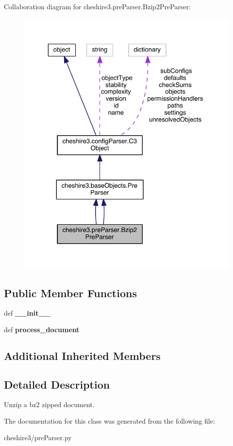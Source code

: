 Collaboration diagram for cheshire3.\-pre\-Parser.\-Bzip2\-Pre\-Parser\-:
\nopagebreak
\begin{figure}[H]
\begin{center}
\leavevmode
\includegraphics[width=325pt]{classcheshire3_1_1pre_parser_1_1_bzip2_pre_parser__coll__graph}
\end{center}
\end{figure}
\subsection*{Public Member Functions}
\begin{DoxyCompactItemize}
\item 
\hypertarget{classcheshire3_1_1pre_parser_1_1_bzip2_pre_parser_af7ccc3644d484f30c60dd867af1b708e}{def {\bfseries \-\_\-\-\_\-init\-\_\-\-\_\-}}\label{classcheshire3_1_1pre_parser_1_1_bzip2_pre_parser_af7ccc3644d484f30c60dd867af1b708e}

\item 
\hypertarget{classcheshire3_1_1pre_parser_1_1_bzip2_pre_parser_a4fcbaee3a9c1b9edad7ecaae14c07a1a}{def {\bfseries process\-\_\-document}}\label{classcheshire3_1_1pre_parser_1_1_bzip2_pre_parser_a4fcbaee3a9c1b9edad7ecaae14c07a1a}

\end{DoxyCompactItemize}
\subsection*{Additional Inherited Members}


\subsection{Detailed Description}
\begin{DoxyVerb}Unzip a bz2 zipped document.\end{DoxyVerb}
 

The documentation for this class was generated from the following file\-:\begin{DoxyCompactItemize}
\item 
cheshire3/pre\-Parser.\-py\end{DoxyCompactItemize}
